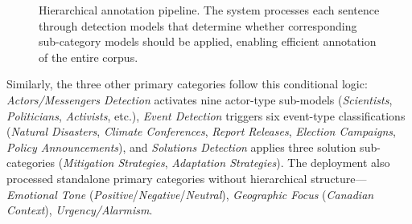 \documentclass[12pt]{article}
\begin{document}
\begin{figure}[b!]
{
}
\caption{Hierarchical annotation pipeline. The system processes each sentence through detection models that determine whether corresponding sub-category models should be applied, enabling efficient annotation of the entire corpus.}
\label{fig:hierarchical_annotation}
\end{figure}

Similarly, the three other primary categories follow this conditional logic: \emph{Actors/Messengers Detection} activates nine actor-type sub-models (\emph{Scientists}, \emph{Politicians}, \emph{Activists}, etc.), \emph{Event Detection} triggers six event-type classifications (\emph{Natural Disasters}, \emph{Climate Conferences}, \emph{Report Releases}, \emph{Election Campaigns}, \emph{Policy Announcements}), and \emph{Solutions Detection} applies three solution sub-categories (\emph{Mitigation Strategies}, \emph{Adaptation Strategies}). The deployment also processed standalone primary categories without hierarchical structure—\emph{Emotional Tone} (\emph{Positive}/\emph{Negative}/\emph{Neutral}), \emph{Geographic Focus} (\emph{Canadian Context}), \emph{Urgency/Alarmism}. 
\end{document}
